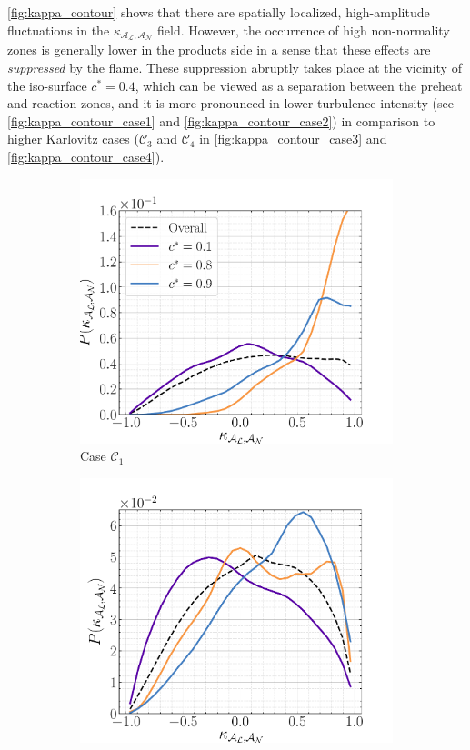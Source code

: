 \documentclass[review,times,sort&compress]{elsarticle}
\begin{document}
%
\autoref{fig:kappa_contour} shows that there are spatially localized, high-amplitude fluctuations
in the $\kappa_{\mathcal{A}_{\mathcal{L}}, \mathcal{A}_{\mathcal{N}}}$ field.
%
However, the occurrence of high non-normality zones is generally lower in the products side
in a sense that these effects are \emph{suppressed} by the flame.
%
These suppression abruptly takes place at the vicinity of the iso-surface $c^{*}=0.4$, which can be
viewed as a separation between the preheat and reaction zones, and it is more pronounced in lower
turbulence intensity (see \autoref{fig:kappa_contour_case1} and \autoref{fig:kappa_contour_case2})
in comparison to higher Karlovitz cases ($\mathcal{C}_3$ and $\mathcal{C}_4$ in 
\autoref{fig:kappa_contour_case3} and \autoref{fig:kappa_contour_case4}).
%
\begin{figure}
\begin{subfigure}{.48\textwidth}
\centering
\includegraphics[width=.99\textwidth]{./figs/kappa_B_C_pdf/case1.pdf}
\caption{Case $\mathcal{C}_1$}
\label{fig:kappa_pdf_case1}
\end{subfigure}
%
\begin{subfigure}{.48\textwidth}
\centering
\includegraphics[width=.99\textwidth]{./figs/kappa_B_C_pdf/case2.pdf}

\end{subfigure}
\end{figure}
\end{document}
